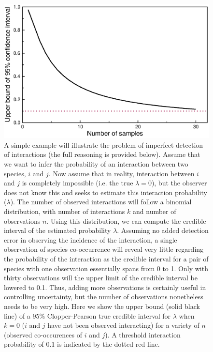 \documentclass[12pt]{article}
\begin{document}




  \begin{figure}[h!]
    \caption{A simple example will illustrate the problem of imperfect detection of interactions (the full reasoning is provided below). Assume that we want to infer the probability of an interaction between two species, $i$ and $j$. Now assume that in reality, interaction between $i$ and $j$ is completely impossible (i.e. the true $\lambda=0$), but the observer does not know this and seeks to estimate this interaction probability ($\lambda$). The number of observed interactions will follow a binomial distribution, with number of interactions $k$ and number of observations $n$. Using this distribution, we can compute the credible interval of the estimated probability $\lambda$. Assuming no added detection error in observing the incidence of the interaction, a single observation of species co-occurrence will reveal very little regarding the probability of the interaction as the credible interval for a pair of species with one observation essentially spans from 0 to 1. Only with thirty observations will the upper limit of the credible interval be lowered to 0.1. Thus, adding more observations is certainly useful in controlling uncertainty, but the number of observations nonetheless needs to be very high. Here we show the upper bound (solid black line) of a 95\% Clopper-Pearson true credible interval for $\lambda$ when $k=0$ ($i$ and $j$ have not been observed interacting) for a variety of $n$ (observed co-occurences of $i$ and $j$). A threshold interaction probability of 0.1 is indicated by the dotted red line.    }
    \label{upper_limits}
    \includegraphics*[width=.8\textwidth]{figures/upper_limit_DG.eps}
  \end{figure}
\end{document}
